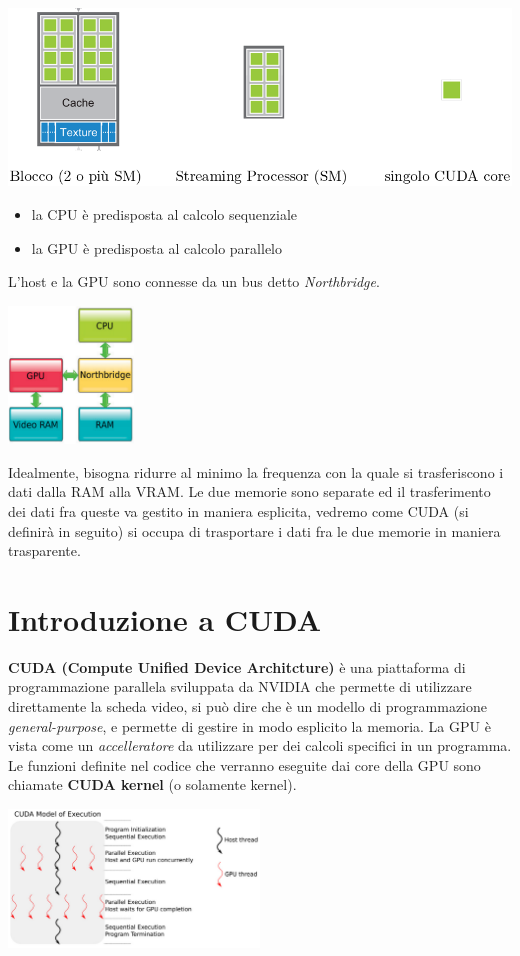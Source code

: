 \documentclass[10pt, letterpaper]{report}
\begin{document}
\begin{center}
    \includegraphics[width=\textwidth ]{images/SMblocchiCore.png}
\end{center}\begin{itemize}
    \item la CPU è predisposta al calcolo sequenziale 
    \item la GPU è predisposta al calcolo parallelo
\end{itemize}
L'host e la GPU sono connesse da un bus detto \textit{Northbridge}.\begin{center}
    \includegraphics[width=0.25\textwidth ]{images/GPUCPU.png}
\end{center}
Idealmente, bisogna ridurre al minimo la frequenza con la quale si trasferiscono i dati dalla RAM alla VRAM. Le due memorie sono separate ed il trasferimento dei dati fra queste va gestito in maniera esplicita, vedremo come CUDA (si definirà in seguito) si occupa di trasportare i dati fra le due memorie in maniera trasparente.\flowerLine 
\section{Introduzione a CUDA}
\textbf{CUDA (Compute Unified Device Architcture)} è una piattaforma di programmazione parallela sviluppata da NVIDIA che permette di utilizzare direttamente la scheda video, si può dire che è un modello di programmazione \textit{general-purpose}, e permette di gestire in modo esplicito la memoria. La GPU è vista come un \textit{accelleratore} da utilizzare per dei calcoli specifici in un programma. 
Le funzioni definite nel codice che verranno eseguite dai core della GPU sono chiamate \textbf{CUDA kernel} (o solamente kernel).\begin{center}
    \includegraphics[width=0.5\textwidth ]{images/CUDAmodel.png}
\end{center}
\end{document}

